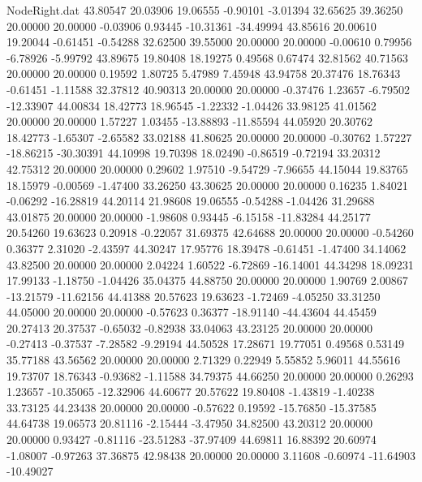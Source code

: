 \begin{filecontents}{NodeRight.dat}
  43.80547   20.03906   19.06555    -0.90101   -3.01394   32.65625   39.36250   20.00000   20.00000   -0.03906    0.93445  -10.31361  -34.49994
  43.85616   20.00610   19.20044    -0.61451   -0.54288   32.62500   39.55000   20.00000   20.00000   -0.00610    0.79956   -6.78926   -5.99792
  43.89675   19.80408   18.19275     0.49568    0.67474   32.81562   40.71563   20.00000   20.00000    0.19592    1.80725    5.47989    7.45948
  43.94758   20.37476   18.76343    -0.61451   -1.11588   32.37812   40.90313   20.00000   20.00000   -0.37476    1.23657   -6.79502  -12.33907
  44.00834   18.42773   18.96545    -1.22332   -1.04426   33.98125   41.01562   20.00000   20.00000    1.57227    1.03455  -13.88893  -11.85594
  44.05920   20.30762   18.42773    -1.65307   -2.65582   33.02188   41.80625   20.00000   20.00000   -0.30762    1.57227  -18.86215  -30.30391
  44.10998   19.70398   18.02490    -0.86519   -0.72194   33.20312   42.75312   20.00000   20.00000    0.29602    1.97510   -9.54729   -7.96655
  44.15044   19.83765   18.15979    -0.00569   -1.47400   33.26250   43.30625   20.00000   20.00000    0.16235    1.84021   -0.06292  -16.28819
  44.20114   21.98608   19.06555    -0.54288   -1.04426   31.29688   43.01875   20.00000   20.00000   -1.98608    0.93445   -6.15158  -11.83284
  44.25177   20.54260   19.63623     0.20918   -0.22057   31.69375   42.64688   20.00000   20.00000   -0.54260    0.36377    2.31020   -2.43597
  44.30247   17.95776   18.39478    -0.61451   -1.47400   34.14062   43.82500   20.00000   20.00000    2.04224    1.60522   -6.72869  -16.14001
  44.34298   18.09231   17.99133    -1.18750   -1.04426   35.04375   44.88750   20.00000   20.00000    1.90769    2.00867  -13.21579  -11.62156
  44.41388   20.57623   19.63623    -1.72469   -4.05250   33.31250   44.05000   20.00000   20.00000   -0.57623    0.36377  -18.91140  -44.43604
  44.45459   20.27413   20.37537    -0.65032   -0.82938   33.04063   43.23125   20.00000   20.00000   -0.27413   -0.37537   -7.28582   -9.29194
  44.50528   17.28671   19.77051     0.49568    0.53149   35.77188   43.56562   20.00000   20.00000    2.71329    0.22949    5.55852    5.96011
  44.55616   19.73707   18.76343    -0.93682   -1.11588   34.79375   44.66250   20.00000   20.00000    0.26293    1.23657  -10.35065  -12.32906
  44.60677   20.57622   19.80408    -1.43819   -1.40238   33.73125   44.23438   20.00000   20.00000   -0.57622    0.19592  -15.76850  -15.37585
  44.64738   19.06573   20.81116    -2.15444   -3.47950   34.82500   43.20312   20.00000   20.00000    0.93427   -0.81116  -23.51283  -37.97409
  44.69811   16.88392   20.60974    -1.08007   -0.97263   37.36875   42.98438   20.00000   20.00000    3.11608   -0.60974  -11.64903  -10.49027

\end{filecontents}
